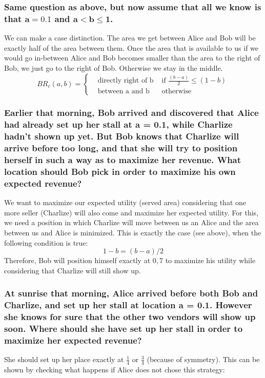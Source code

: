 \documentclass[11pt]{article}
\begin{document}
    \subsubsection{Same question as above, but now assume that all we know is that $\mathbf{a = 0.1}$ and $\mathbf{a<b\leq1}$.}
    We can make a case distinction. The area we get between Alice and Bob will be exactly half of the area between them.
    Once the area that is available to us if we would go in-between Alice and Bob becomes smaller than the area to the right of
    Bob, we just go to the right of Bob. Otherwise we stay in the middle.
    \begin{equation*}
        BR_c(a,b)=\left\{
        \begin{array}{lll}
            & \text{directly right of b } & \mbox{if } \frac{(b-a)}{2}\leq(1-b) \\
            & \mbox{between a and b}      & \text{otherwise}
        \end{array}
        \right.
    \end{equation*}

    \subsubsection{Earlier that morning, Bob arrived and discovered that Alice had already set up her stall at a = 0.1, while Charlize hadn’t shown up yet. But Bob knows that Charlize will arrive before too long, and that she will try to position herself in such a way as to maximize her revenue. What location should Bob pick in order to maximize his own expected revenue?}
    We want to maximize our expected utility (served area) considering that one more seller (Charlize) will also come and maximize
    her expected utility. For this, we need a position in which Charlize will move between us an Alice and the area between us and
    Alice is minimized. This is exactly the case (see above), when the following condition is true:
    \begin{equation*}
        1-b = (b-a)/2
    \end{equation*}
    Therefore, Bob will position himself exactly at $0,7$ to maximize his utility while considering that Charlize will still show up.

    \subsubsection{At sunrise that morning, Alice arrived before both Bob and Charlize, and set up her stall at location a = 0.1. However she knows for sure that the other two vendors will show up soon. Where should she have set up her stall in order to maximize her expected revenue?}
    She should set up her place exactly at $\frac{1}{4}$ or $\frac{3}{4}$ (because of symmetry). This can be shown by checking what happens
    if Alice does not chose this strategy:
\end{document}
